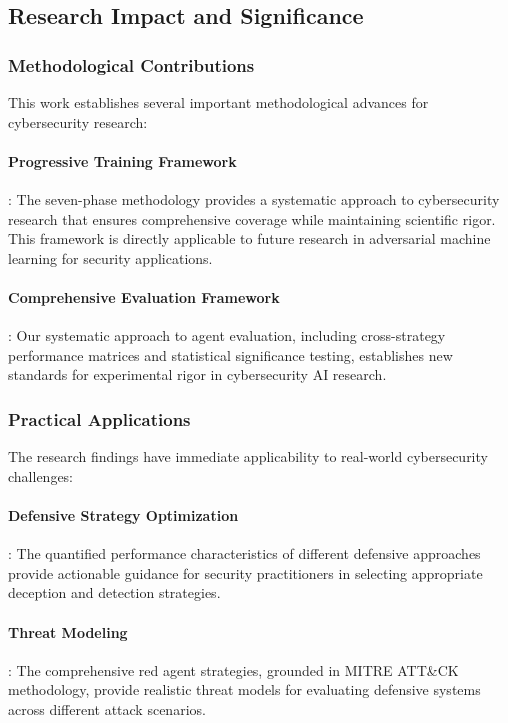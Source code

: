 \documentclass[12pt,oneside]{article}
\begin{document}
\subsection{Research Impact and Significance}

\subsubsection{Methodological Contributions}
This work establishes several important methodological advances for cybersecurity research:


\paragraph{Progressive Training Framework}: The seven-phase methodology provides a systematic approach to cybersecurity research that ensures comprehensive coverage while maintaining scientific rigor. This framework is directly applicable to future research in adversarial machine learning for security applications.

\paragraph{Comprehensive Evaluation Framework}: Our systematic approach to agent evaluation, including cross-strategy performance matrices and statistical significance testing, establishes new standards for experimental rigor in cybersecurity AI research.

\subsubsection{Practical Applications}
The research findings have immediate applicability to real-world cybersecurity challenges:

\paragraph{Defensive Strategy Optimization}: The quantified performance characteristics of different defensive approaches provide actionable guidance for security practitioners in selecting appropriate deception and detection strategies.

\paragraph{Threat Modeling}: The comprehensive red agent strategies, grounded in MITRE ATT\&CK methodology, provide realistic threat models for evaluating defensive systems across different attack scenarios.
\end{document}
